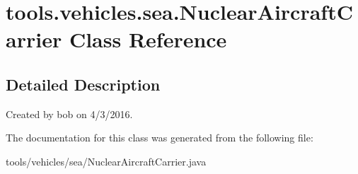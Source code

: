 \hypertarget{classtools_1_1vehicles_1_1sea_1_1_nuclear_aircraft_carrier}{}\section{tools.\+vehicles.\+sea.\+Nuclear\+Aircraft\+Carrier Class Reference}
\label{classtools_1_1vehicles_1_1sea_1_1_nuclear_aircraft_carrier}


\subsection{Detailed Description}
Created by bob on 4/3/2016. 

The documentation for this class was generated from the following file\+:\begin{DoxyCompactItemize}
\item 
tools/vehicles/sea/Nuclear\+Aircraft\+Carrier.\+java\end{DoxyCompactItemize}
